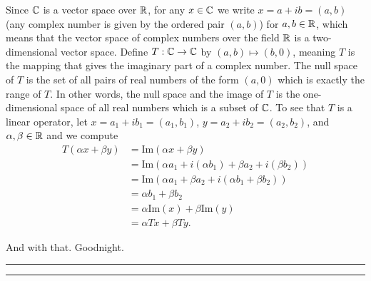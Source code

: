\documentclass{article}
\begin{document}
	Since $\mathbb C$ is a vector space over $\mathbb R$, for any $x\in \mathbb C$ we write $x = a+ ib = (a, b)$ (any complex number is given by the ordered pair $(a,b)$) for 
	$a,b\in\mathbb R$, which means that the vector space of complex numbers over the field $\mathbb R$ is a two-dimensional vector space. Define $T:\mathbb C\to\mathbb C$ by
	 $(a,b) \mapsto (b,0)$, meaning $T$ is the mapping that gives the imaginary part of a complex number. The null space of $T$ is the set of all pairs
	  of real numbers of the form $(a,0)$ which is exactly the range of $T$. In other words, the null space and the image of $T$ is the one-dimensional space of 
	  all real numbers which is a subset of $\mathbb C$. To see that $T$ is a linear operator, let $x = a_1 + ib_1 = (a_1, b_1)$, $y = a_2 + ib_2 = (a_2, b_2)$, and
	  $\alpha, \beta\in\mathbb R$ and we compute 
	  	\begin{align*}
			T(\alpha x+ \beta y) & = \text{Im}(\alpha x+ \beta y)\\
						       & = \text{Im}(\alpha a_1 + i(\alpha b_1) + \beta a_2 + i (\beta b_2))\\
						       & = \text{Im}(\alpha a_1 + \beta a_2 + i(\alpha b_1 + \beta b_2))\\
						       & = \alpha b_1 + \beta b_2\\
						       & = \alpha \text{Im}(x) + \beta  \text{Im}(y)\\
						       & = \alpha Tx + \beta Ty.
		\end{align*}

And with that. Goodnight.\\

\hrule \vspace{2pts}
\hrule
\end{document}
